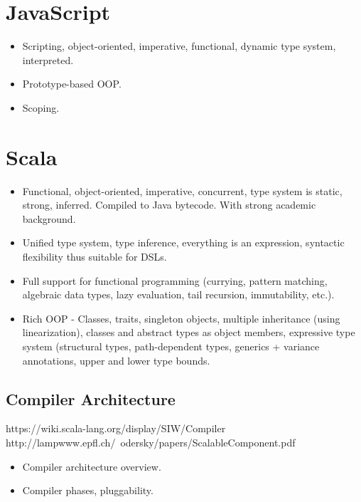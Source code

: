 \documentclass[12pt,a4paper]{report}
\begin{document}
\section{JavaScript}

\begin{itemize}
\item Scripting, object-oriented, imperative, functional, dynamic type system, interpreted. 
\item Prototype-based OOP.
\item Scoping.
\end{itemize}

\section{Scala}

\begin{itemize}
\item Functional, object-oriented, imperative, concurrent, type system is static, strong, inferred. Compiled to Java bytecode. With strong academic background.
\item Unified type system, type inference, everything is an expression, syntactic flexibility thus suitable for DSLs.
\item Full support for functional programming (currying, pattern matching, algebraic data types, lazy evaluation, tail recursion, immutability, etc.).
\item Rich OOP - Classes, traits, singleton objects, multiple inheritance (using linearization), classes and abstract types as object members, expressive type system (structural types, path-dependent types, generics + variance annotations, upper and lower type bounds.
\end{itemize}

\subsection{Compiler Architecture}

https://wiki.scala-lang.org/display/SIW/Compiler
http://lampwww.epfl.ch/~odersky/papers/ScalableComponent.pdf

\begin{itemize}
\item Compiler architecture overview.
\item Compiler phases, pluggability.
\end{itemize}



\end{document}
